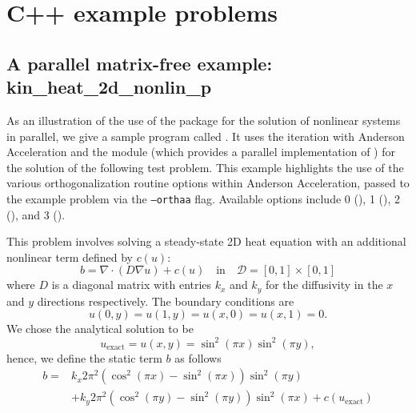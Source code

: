 \section{C++ example problems}\label{s:ex_cpp}

\subsection{A parallel matrix-free example: kin\_heat\_2d\_nonlin\_p}
\label{ss:kin_heat_2d_nonlin_p}

As an illustration of the use of the {\kinsol} package for the solution of
nonlinear systems in parallel, we give a sample program called
.  It uses the {\kinsol}  iteration
with Anderson Acceleration and the {\nvecp} module (which provides a parallel
implementation of {\nvector}) for the solution of the following test problem.
This example highlights the use of the various orthogonalization routine options
within Anderson Acceleration, passed to the example problem via the
\texttt{--orthaa} flag. Available options include 0 (), 1
(), 2 (), and 3 ().

This problem involves solving a steady-state 2D heat equation with an additional
nonlinear term defined by $c(u)$:
\begin{equation}
  b = \nabla \cdot (D \nabla u) + c(u) \quad \text{in} \quad
  \mathcal{D} = [0,1] \times [0,1]
\end{equation}
where $D$ is a diagonal matrix with entries $k_x$ and $k_y$ for the diffusivity
in the $x$ and $y$ directions respectively. The boundary conditions are
\begin{equation}
  u(0,y) = u(1,y) = u(x,0) = u(x,1) = 0.
\end{equation}
We chose the analytical solution to be
\begin{equation}
  u_{\text{exact}} = u(x,y) = \sin^2(\pi x) \sin^2(\pi y),
\end{equation}
hence, we define the static term $b$ as follows
\begin{equation}
  \begin{aligned}
    b = &k_x 2 \pi^2 (\cos^2(\pi x) - \sin^2(\pi x)) \sin^2(\pi y) \\
        &+ k_y 2 \pi^2 (\cos^2(\pi y) - \sin^2(\pi y)) \sin^2(\pi x)
        + c(u_{\text{exact}})
  \end{aligned}
\end{equation}

